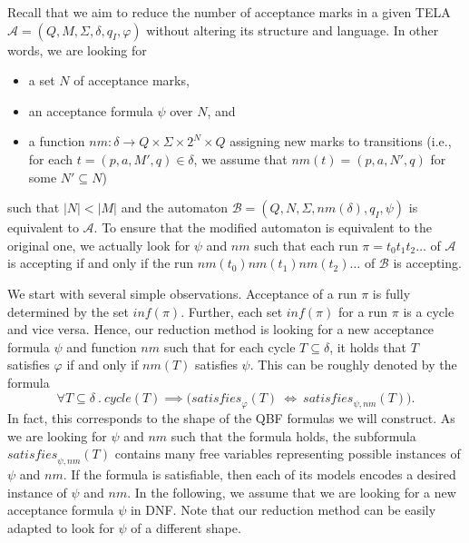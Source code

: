 \documentclass[runningheads]{llncs}
\newcommand{\minf}{\mathit{inf}}
\newcommand{\oM}{N}
\newcommand{\rem}{\mathit{nm}}
\newcommand{\mcycle}{\mathit{cycle}}
\newcommand{\msat}{\mathit{satisfies}}
\newcommand{\mA}{\mathcal{A}}
\newcommand{\mB}{\mathcal{B}}
\begin{document}
Recall that we aim to reduce the number of acceptance marks in a given
TELA $\mA =(Q,M,\Sigma,\delta,q_I,\varphi)$ without altering its
structure and language. In other words, we are looking for
\begin{itemize}
\item a set $\oM$ of acceptance marks,
\item an acceptance formula $\psi$ over $\oM$, and 
\item a function
  $\rem:\delta\rightarrow Q \times \Sigma \times 2^{\oM}\times Q$
  assigning new marks to transitions (i.e., for each
  $t=(p,a,M',q)\in\delta$, we assume that $\rem(t)=(p,a,\oM',q)$ for
  some $\oM'\subseteq\oM$)
\end{itemize}
such that $|\oM|<|M|$ and the automaton
$\mB=(Q,\oM,\Sigma,\rem(\delta),q_I,\psi)$ is equivalent to $\mA$. To
ensure that the modified automaton is equivalent to the original one,
we actually look for $\psi$ and $\rem$ such that each run
$\pi=t_0t_1t_2\ldots$ of $\mA$ is accepting if and only if the run
$\rem(t_0)\rem(t_1)\rem(t_2)\ldots$ of $\mB$ is accepting.

We start with several simple observations. Acceptance of a run $\pi$
is fully determined by the set $\minf(\pi)$.
Further, each set $\minf(\pi)$ for a run $\pi$ is a cycle and vice
versa. Hence, our reduction method is looking for a new acceptance
formula $\psi$ and function $\rem$ such that for each cycle
$T\subseteq\delta$, it holds that $T$ satisfies $\varphi$ if and only
if $\rem(T)$ satisfies $\psi$. This can be roughly denoted by the
formula
\[
  \forall T\subseteq\delta~.~\mcycle(T)\implies\big(\msat_\varphi(T) ~\iff~ \msat_{\psi,\rem}(T)\big).
\]
In fact, this corresponds to the shape of the QBF formulas we will
construct. As we are looking for $\psi$ and $\rem$ such that the
formula holds, the subformula $\msat_{\psi,\rem}(T)$ contains many
free variables representing possible instances of $\psi$ and
$\rem$. If the formula is satisfiable, then each of its models encodes
a desired instance of $\psi$ and $\rem$.  In the following, we assume
that we are looking for a new acceptance formula $\psi$ in DNF. Note
that our reduction method can be easily adapted to look for $\psi$ of
a different shape.
\end{document}
